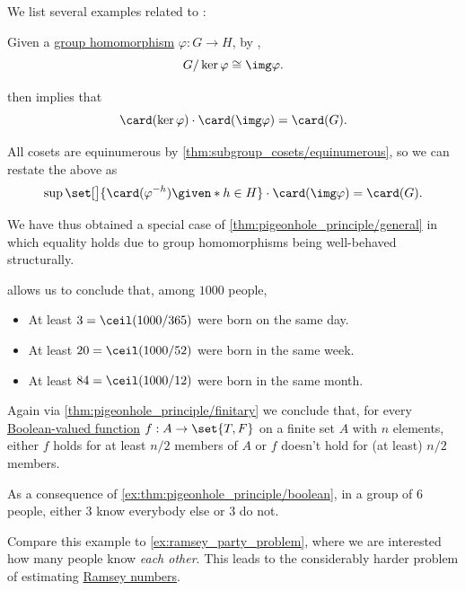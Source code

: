 \begin{example}\label{ex:thm:pigeonhole_principle}
  We list several examples related to :
  \begin{thmenum}
     Given a \hyperref[def:group/morphism]{group homomorphism} \( \varphi: G \to H \), by ,
    \begin{equation*}
      G / \ker \varphi \cong \img \varphi.
    \end{equation*}

     then implies that
    \begin{equation*}
      \card(\ker \varphi) \cdot \card(\img \varphi) = \card(G).
    \end{equation*}

    All cosets are equinumerous by \cref{thm:subgroup_cosets/equinumerous}, so we can restate the above as
    \begin{equation*}
      \sup\set[\big]{ \card(\varphi^{-h}) \given* h \in H } \cdot \card(\img \varphi) = \card(G).
    \end{equation*}

    We have thus obtained a special case of \cref{thm:pigeonhole_principle/general} in which equality holds due to group homomorphisms being well-behaved structurally.

      allows us to conclude that, among \( 1000 \) people,
    \begin{itemize}
      \item At least \( 3 = \ceil(1000 / 365) \) were born on the same day.
      \item At least \( 20 = \ceil(1000 / 52) \) were born in the same week.
      \item At least \( 84 = \ceil(1000 / 12) \) were born in the same month.
    \end{itemize}

     Again via \cref{thm:pigeonhole_principle/finitary} we conclude that, for every \hyperref[def:boolean_function]{Boolean-valued function} \( f: A \to \set{ T, F } \) on a finite set \( A \) with \( n \) elements, either \( f \) holds for at least \( n / 2 \) members of \( A \) or \( f \) doesn't hold for (at least) \( n / 2 \) members.

     As a consequence of \cref{ex:thm:pigeonhole_principle/boolean}, in a group of \( 6 \) people, either \( 3 \) know everybody else or \( 3 \) do not.

    Compare this example to \cref{ex:ramsey_party_problem}, where we are interested how many people know \emph{each other}. This leads to the considerably harder problem of estimating \hyperref[def:ramsey_number]{Ramsey numbers}.
  \end{thmenum}
\end{example}


